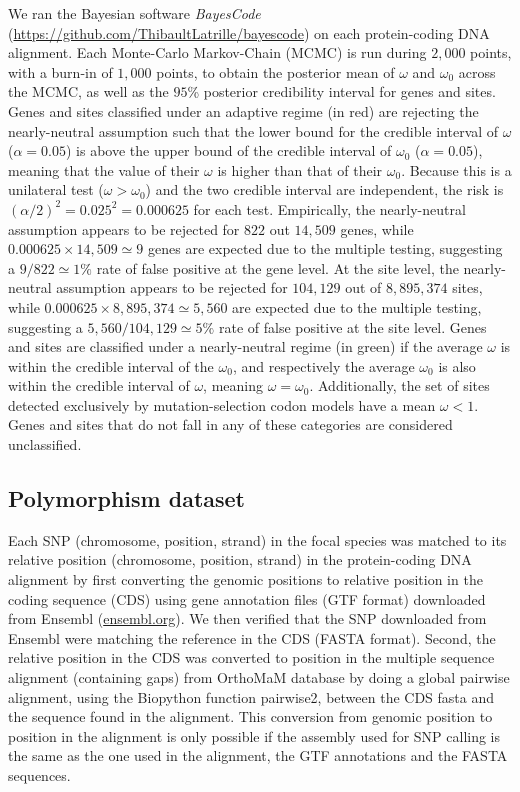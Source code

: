 \documentclass[9pt,twocolumn,twoside,lineno]{pnas-new}
\begin{document}
{       We ran the Bayesian software \textit{BayesCode} (\url{https://github.com/ThibaultLatrille/bayescode}) on each protein-coding DNA alignment\cite{rodrigue_bayesian_2021}.
       Each Monte-Carlo Markov-Chain (MCMC) is run during $2,000$ points, with a burn-in of $1,000$ points, to obtain the posterior mean of $\omega$ and $\omega_{0}$ across the MCMC, as well as the $95$\% posterior credibility interval for genes and sites.
       Genes and sites classified under an adaptive regime (in red) are rejecting the nearly-neutral assumption such that the lower bound for the credible interval of $\omega$ ($\alpha=0.05$) is above the upper bound of the credible interval of $\omega_{0}$ ($\alpha=0.05$), meaning that the value of their $\omega$ is higher than that of their $\omega_{0}$.
       Because this is a unilateral test ($\omega > \omega_{0}$) and the two credible interval are independent, the risk is $(\alpha/2)^2=0.025^2=0.000625$ for each test.
       Empirically, the nearly-neutral assumption appears to be rejected for $822$ out $14,509$ genes, while $0.000625 \times 14,509 \simeq 9$ genes are expected due to the multiple testing, suggesting a $9 / 822 \simeq 1\%$ rate of false positive at the gene level.
       At the site level, the nearly-neutral assumption appears to be rejected for $104,129$ out of $8,895,374$ sites, while $0.000625 \times 8,895,374 \simeq 5,560$ are expected due to the multiple testing, suggesting a $5,560 / 104,129 \simeq 5\%$ rate of false positive at the site level.
       Genes and sites are classified under a nearly-neutral regime (in green) if the average $\omega$ is within the credible interval of the $\omega_{0}$, and respectively the average $\omega_{0}$ is also within the credible interval of  $\omega$, meaning $\omega = \omega_{0}$.
       Additionally, the set of sites detected exclusively by mutation-selection codon models have a mean $\omega < 1 $.
       Genes and sites that do not fall in any of these categories are considered unclassified.

       \subsection*{Polymorphism dataset}

       Each SNP (chromosome, position, strand) in the focal species was matched to its relative position (chromosome, position, strand) in the protein-coding DNA alignment by first converting the genomic positions to relative position in the coding sequence (CDS) using gene annotation files (GTF format) downloaded from Ensembl (\url{ensembl.org}).
       We then verified that the SNP downloaded from Ensembl were matching the reference in the CDS (FASTA format).
       Second, the relative position in the CDS was converted to position in the multiple sequence alignment (containing gaps) from OrthoMaM database\cite{ranwez_orthomam_2007, douzery_orthomam_2014, scornavacca_orthomam_2019} by doing a global pairwise alignment, using the Biopython function pairwise2, between the CDS fasta and the sequence found in the alignment.
       This conversion from genomic position to position in the alignment is only possible if the assembly used for SNP calling is the same as the one used in the alignment, the GTF annotations and the FASTA sequences.

}
\end{document}
